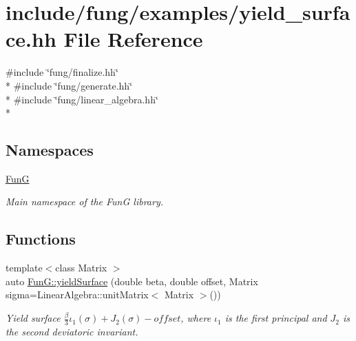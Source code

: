 \hypertarget{yield__surface_8hh}{\section{include/fung/examples/yield\-\_\-surface.hh File Reference}
\label{yield__surface_8hh}
}
{\ttfamily \#include \char`\"{}fung/finalize.\-hh\char`\"{}}\\*
{\ttfamily \#include \char`\"{}fung/generate.\-hh\char`\"{}}\\*
{\ttfamily \#include \char`\"{}fung/linear\-\_\-algebra.\-hh\char`\"{}}\\*
\subsection*{Namespaces}
\begin{DoxyCompactItemize}
\item 
\hyperlink{namespaceFunG}{Fun\-G}
\begin{DoxyCompactList}\small\item\em Main namespace of the Fun\-G library. \end{DoxyCompactList}\end{DoxyCompactItemize}
\subsection*{Functions}
\begin{DoxyCompactItemize}
\item 
{\footnotesize template$<$class Matrix $>$ }\\auto \hyperlink{namespaceFunG_a4784211358c877f05ad9426850303273}{Fun\-G\-::yield\-Surface} (double beta, double offset, Matrix sigma=Linear\-Algebra\-::unit\-Matrix$<$ Matrix $>$())
\begin{DoxyCompactList}\small\item\em Yield surface $ \frac{\beta}{3}\iota_1(\sigma) + J_2(\sigma)-offset $, where $\iota_1$ is the first principal and $J_2$ is the second deviatoric invariant. \end{DoxyCompactList}\end{DoxyCompactItemize}
